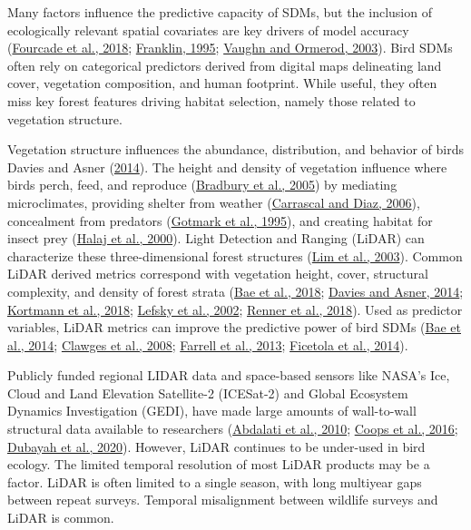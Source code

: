 \documentclass[
  12pt,
]{article}
\begin{document}
Many factors influence the predictive capacity of SDMs, but the inclusion of ecologically relevant spatial covariates are key drivers of model accuracy (\protect\hyperlink{ref-fourcadePaintingsPredictDistribution2018}{Fourcade et al., 2018}; \protect\hyperlink{ref-Franklin1995}{Franklin, 1995}; \protect\hyperlink{ref-Vaughn2003}{Vaughn and Ormerod, 2003}). Bird SDMs often rely on categorical predictors derived from digital maps delineating land cover, vegetation composition, and human footprint. While useful, they often miss key forest features driving habitat selection, namely those related to vegetation structure.

Vegetation structure influences the abundance, distribution, and behavior of birds Davies and Asner (\protect\hyperlink{ref-Davies2014a}{2014}). The height and density of vegetation influence where birds perch, feed, and reproduce (\protect\hyperlink{ref-Bradbury2005}{Bradbury et al., 2005}) by mediating microclimates, providing shelter from weather (\protect\hyperlink{ref-CarrascalDiaz2006}{Carrascal and Diaz, 2006}), concealment from predators (\protect\hyperlink{ref-GotmarkBlomqvist1995}{Gotmark et al., 1995}), and creating habitat for insect prey (\protect\hyperlink{ref-halajImportanceHabitatStructure2000}{Halaj et al., 2000}). Light Detection and Ranging (LiDAR) can characterize these three-dimensional forest structures (\protect\hyperlink{ref-limLiDARRemoteSensing2003}{Lim et al., 2003}). Common LiDAR derived metrics correspond with vegetation height, cover, structural complexity, and density of forest strata (\protect\hyperlink{ref-Bae2018}{Bae et al., 2018}; \protect\hyperlink{ref-Davies2014a}{Davies and Asner, 2014}; \protect\hyperlink{ref-Kortmann2018}{Kortmann et al., 2018}; \protect\hyperlink{ref-Lefsky2002}{Lefsky et al., 2002}; \protect\hyperlink{ref-Renner2018}{Renner et al., 2018}). Used as predictor variables, LiDAR metrics can improve the predictive power of bird SDMs (\protect\hyperlink{ref-Bae2014}{Bae et al., 2014}; \protect\hyperlink{ref-clawgesUseAirborneLidar2008}{Clawges et al., 2008}; \protect\hyperlink{ref-farrellUsingLiDARderivedVegetation2013b}{Farrell et al., 2013}; \protect\hyperlink{ref-ficetolaHowManyPredictors2014}{Ficetola et al., 2014}).

Publicly funded regional LIDAR data and space-based sensors like NASA's Ice, Cloud and Land Elevation Satellite-2 (ICESat-2) and Global Ecosystem Dynamics Investigation (GEDI), have made large amounts of wall-to-wall structural data available to researchers (\protect\hyperlink{ref-abdalatiICESat2LaserAltimetry2010}{Abdalati et al., 2010}; \protect\hyperlink{ref-coopsForestStructureHabitat2016}{Coops et al., 2016}; \protect\hyperlink{ref-dubayahGlobalEcosystemDynamics2020a}{Dubayah et al., 2020}). However, LiDAR continues to be under-used in bird ecology. The limited temporal resolution of most LiDAR products may be a factor. LiDAR is often limited to a single season, with long multiyear gaps between repeat surveys. Temporal misalignment between wildlife surveys and LiDAR is common.
\end{document}
